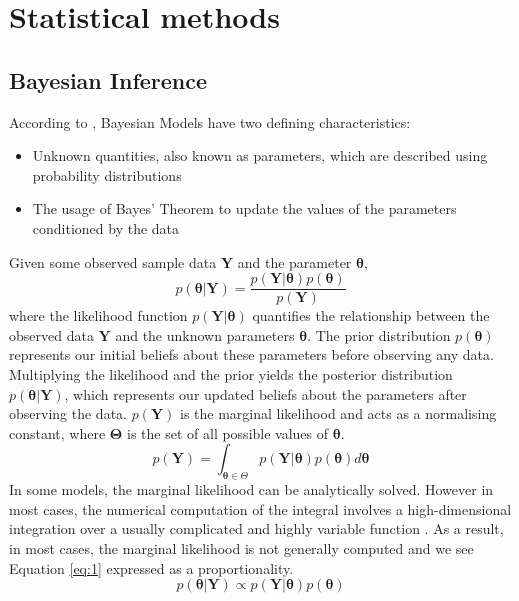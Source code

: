 \documentclass[12 pt]{scrartcl}
\begin{document}
	\section{Statistical methods}
	
	\subsection{Bayesian Inference}
	According to \citep[1.1]{BMCP2021}, Bayesian Models have two defining characteristics:
	\begin{itemize}
		\item Unknown quantities, also known as parameters, which are described using probability distributions
		\item The usage of Bayes' Theorem to update the values of the parameters conditioned by the data
	\end{itemize}
	Given some observed sample data $\boldsymbol{Y}$ and the parameter $\boldsymbol{\theta}$,
	\begin{equation}
		p(\boldsymbol{\theta}|\boldsymbol{Y}) = \frac{p(\boldsymbol{Y}|\boldsymbol{\theta}) p(\boldsymbol{\theta})}{p(\boldsymbol{Y})}
		\label{eq:1}
	\end{equation}
	where the likelihood function $p(\boldsymbol{Y} |\boldsymbol{\theta})$ quantifies the relationship between the observed data $\boldsymbol{Y}$ and the unknown parameters $\boldsymbol{\theta}$. The prior distribution $p(\boldsymbol{\theta})$ represents our initial beliefs about these parameters before observing any data. Multiplying the likelihood and the prior yields the posterior distribution $p(\boldsymbol{\theta}|\boldsymbol{Y})$, which represents our updated beliefs about the parameters after observing the data. $p(\boldsymbol{Y})$ is the marginal likelihood and acts as a normalising constant, where $\boldsymbol{\Theta}$ is the set of all possible values of $\boldsymbol{\theta}$.
	\begin{equation}
		p(\boldsymbol{Y}) = \int_{\boldsymbol{\theta} \in \Theta}p(\boldsymbol{Y}|\boldsymbol{\theta})p(\boldsymbol{\theta})d\boldsymbol{\theta}
		\label{eq:2}
	\end{equation}
	In some models, the marginal likelihood can be analytically solved. However in most cases, the numerical computation of the integral involves a high-dimensional integration over a usually complicated and highly variable function \cite[11.7]{BMCP2021}. As a result, in most cases, the marginal likelihood is not generally computed and we see Equation \ref{eq:1} expressed as a proportionality.
	\begin{equation}
		p(\boldsymbol{\theta}|\boldsymbol{Y}) \propto p(\boldsymbol{Y}|\boldsymbol{\theta}) p(\boldsymbol{\theta})
		\label{eq:3}
	\end{equation}
	
\end{document}
